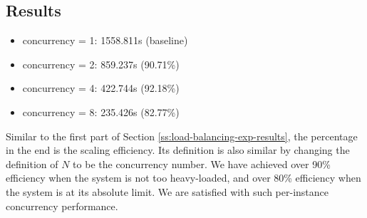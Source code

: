 \subsection{Results}

\begin{itemize}
    \item concurrency = 1: 1558.811s (baseline)
    \item concurrency = 2: 859.237s (90.71\%)
    \item concurrency = 4: 422.744s (92.18\%)
    \item concurrency = 8: 235.426s (82.77\%)
\end{itemize}

Similar to the first part of Section \ref{ss:load-balancing-exp-results}, the percentage in the end is the scaling efficiency. Its definition is also similar by changing the definition of $N$ to be the concurrency number. We have achieved over 90\% efficiency when the system is not too heavy-loaded, and over 80\% efficiency when the system is at its absolute limit. We are satisfied with such per-instance concurrency performance.
